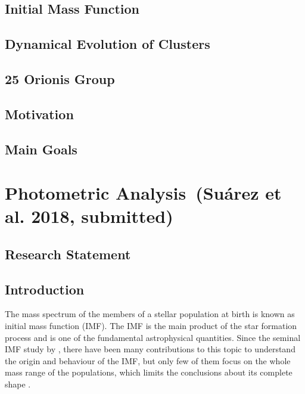 \documentclass[12pt]{article}
\begin{document}
\subsection{Initial Mass Function}
\label{sec:IMF}

\subsection{Dynamical Evolution of Clusters}
\label{sec:evolution}

\subsection{25 Orionis Group}
\label{sec:25Ori}

\subsection{Motivation}
\label{sec:motivation}

\subsection{Main Goals}
\label{sec:goals}

\section{Photometric Analysis\ (Su\'arez et al. 2018, submitted)}
\label{sec:photometry}

\subsection{Research Statement}
\label{sec:rs_photometry}

\subsection{Introduction}
\label{sec_IMF:introduction}

The mass spectrum of the members of a stellar population at birth is known as initial mass function (\ac{IMF}). The IMF is the main product of the star formation process and is one of the fundamental astrophysical quantities. Since the seminal IMF study by \citet{Salpeter1955}, there have been many contributions to this topic to understand the origin and behaviour of the IMF, but only few of them focus on the whole mass range of the populations, which limits the conclusions about its complete shape \cite[e.g.][and references therein]{Bastian2010}.
\end{document}
